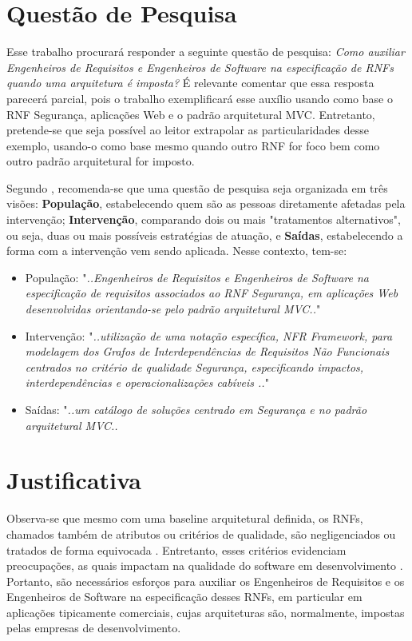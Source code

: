\section{Questão de Pesquisa}
Esse trabalho procurará responder a seguinte questão de pesquisa: \textit{Como auxiliar Engenheiros de Requisitos e Engenheiros de Software na especificação de RNFs quando uma arquitetura é imposta?} É relevante comentar que essa resposta parecerá parcial, pois o trabalho exemplificará esse auxílio usando como base o RNF Segurança, aplicações Web e o padrão arquitetural MVC. Entretanto, pretende-se que seja possível ao leitor extrapolar as particularidades desse exemplo, usando-o como base mesmo quando outro RNF for foco bem como outro padrão arquitetural for imposto.

Segundo \cite{keele2007guidelines}, recomenda-se que uma questão de pesquisa seja organizada em três visões: \textbf{População}, estabelecendo quem são as pessoas diretamente afetadas pela intervenção; \textbf{Intervenção}, comparando dois ou mais "tratamentos alternativos", ou seja, duas ou mais possíveis estratégias de atuação, e \textbf{Saídas}, estabelecendo a forma com a intervenção vem sendo aplicada. Nesse contexto, tem-se: 

\begin{itemize}
	\item População: "\textit{..Engenheiros de Requisitos e Engenheiros de Software na especificação de requisitos associados ao RNF Segurança, em aplicações Web desenvolvidas orientando-se pelo padrão arquitetural MVC..}"
	\item Intervenção: "\textit{..utilização de uma notação específica, NFR Framework, para modelagem dos Grafos de Interdependências de Requisitos Não Funcionais centrados no critério de qualidade Segurança, especificando impactos, interdependências e operacionalizações cabíveis  ..}"
	\item Saídas: "\textit{..um catálogo de soluções centrado em Segurança e no padrão arquitetural MVC..}
\end{itemize}
\section{Justificativa}


Observa-se que mesmo com uma baseline arquitetural definida, os RNFs, chamados também de atributos ou critérios de qualidade, são negligenciados ou tratados de forma equivocada \cite{eckhardt2016non}. Entretanto, esses critérios evidenciam preocupações, as quais impactam na qualidade do software em desenvolvimento \cite{schneidewind1990standard}.  
Portanto, são necessários esforços para auxiliar os Engenheiros de Requisitos e os Engenheiros de Software na especificação desses RNFs, em particular em aplicações tipicamente comerciais, cujas arquiteturas são, normalmente, impostas pelas empresas de desenvolvimento.

